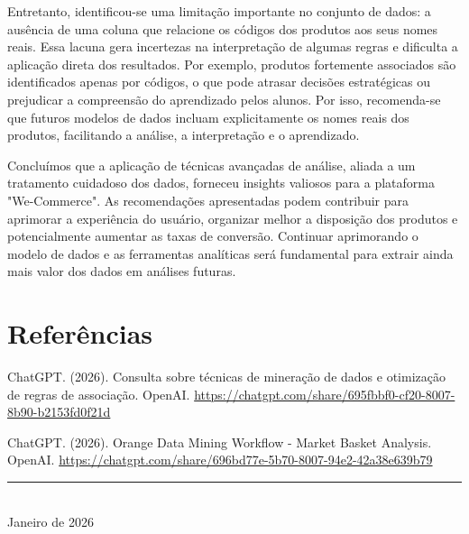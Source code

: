 \documentclass[11pt,a4paper]{article}
\begin{document}
Entretanto, identificou-se uma limitação importante no conjunto de dados: a ausência de uma coluna que relacione os códigos dos produtos aos seus nomes reais. Essa lacuna gera incertezas na interpretação de algumas regras e dificulta a aplicação direta dos resultados. Por exemplo, produtos fortemente associados são identificados apenas por códigos, o que pode atrasar decisões estratégicas ou prejudicar a compreensão do aprendizado pelos alunos. Por isso, recomenda-se que futuros modelos de dados incluam explicitamente os nomes reais dos produtos, facilitando a análise, a interpretação e o aprendizado.

Concluímos que a aplicação de técnicas avançadas de análise, aliada a um tratamento cuidadoso dos dados, forneceu insights valiosos para a plataforma "We-Commerce". As recomendações apresentadas podem contribuir para aprimorar a experiência do usuário, organizar melhor a disposição dos produtos e potencialmente aumentar as taxas de conversão. Continuar aprimorando o modelo de dados e as ferramentas analíticas será fundamental para extrair ainda mais valor dos dados em análises futuras.

\section{Referências}

\begin{enumerate}[label={[\arabic*]}]
    \item ChatGPT. (2026). Consulta sobre técnicas de mineração de dados e otimização de regras de associação. OpenAI. \url{https://chatgpt.com/share/695fbbf0-cf20-8007-8b90-b2153fd0f21d}
    \item ChatGPT. (2026). Orange Data Mining Workflow - Market Basket Analysis. OpenAI. \url{https://chatgpt.com/share/696bd77e-5b70-8007-94e2-42a38e639b79}
\end{enumerate}

\vspace{1cm}

\begin{center}
\rule{0.8\textwidth}{0.4pt}\\
\vspace{0.5cm}
Janeiro de 2026
\end{center}
\end{document}

